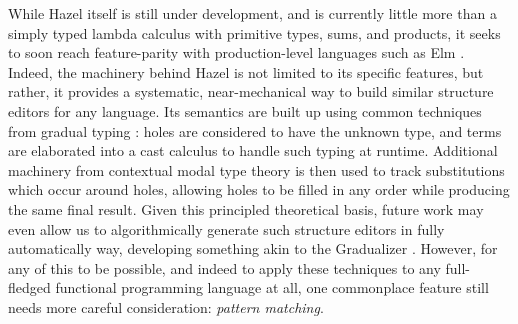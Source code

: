 While Hazel itself is still under development, and is currently little more than a simply typed lambda calculus with primitive types, sums, and products, it seeks to soon reach feature-parity with production-level languages such as Elm \cite{DBLP:conf/pldi/CzaplickiC13, Elm, DBLP:journals/pacmpl/OmarVCH19}. Indeed, the machinery behind Hazel is not limited to its specific features, but rather, it provides a systematic, near-mechanical way to build similar structure editors for any language. Its semantics are built up using common techniques from gradual typing \cite{DBLP:conf/snapl/SiekVCB15}: holes are considered to have the unknown type, and terms are elaborated into a cast calculus to handle such typing at runtime. Additional machinery from contextual modal type theory \cite{DBLP:journals/tocl/NanevskiPP08} is then used to track substitutions which occur around holes, allowing holes to be filled in any order while producing the same final result. Given this principled theoretical basis, future work may even allow us to algorithmically generate such structure editors in fully automatically way, developing something akin to the Gradualizer \cite{DBLP:conf/popl/CiminiS16}. However, for any of this to be possible, and indeed to apply these techniques to any full-fledged functional programming language at all, one commonplace feature still needs more careful consideration: \emph{pattern matching}.